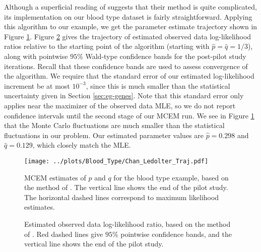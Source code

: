\documentclass[11pt, oneside]{article}   	%
\begin{document}
Although a superficial reading of \citeauthor{Cha95} suggests that their method is quite complicated, its implementation on our blood type dataset is fairly straightforward. Applying this algorithm to our example, we get the parameter estimate trajectory shown in Figure \ref{fig:blood_CL_MCEM_estimates}. Figure \ref{fig:blood_CL_MCEM_likelihoods} gives the trajectory of estimated observed data log-likelihood ratios relative to the starting point of the algorithm (starting with $\hat{p} = \hat{q} = 1/3$), along with pointwise $95\%$ Wald-type confidence bands for the post-pilot study iterations. Recall that these confidence bands are used to assess convergence of the algorithm. We require that the standard error of our estimated log-likelihood increment be at most $10^{-3}$, since this is much smaller than the statistical uncertainty given in Section \ref{sec:eg-genes}. Note that this standard error only applies near the maximizer of the observed data MLE, so we do not report confidence intervals until the second stage of our MCEM run. We see in Figure \ref{fig:blood_CL_MCEM_estimates} that the Monte Carlo fluctuations are much smaller than the statistical fluctuations in our problem. Our estimated parameter values are $\hat{p} = 0.298$ and $\hat{q} = 0.129$, which closely match the MLE.

\begin{figure}
    \centering
    \caption{MCEM estimates of $p$ and $q$ for the blood type example, based on the method of \citet{Cha95}. The vertical line shows the end of the pilot study. The horizontal dashed lines correspond to maximum likelihood estimates.}
    \texttt{[image: ../plots/Blood\_Type/Chan\_Ledolter\_Traj.pdf]} 
    \label{fig:blood_CL_MCEM_estimates}
\end{figure}

\begin{figure}
    \centering
    \caption{Estimated observed data log-likelihood ratio, based on the method of \citet{Cha95}. Red dashed lines give $95\%$ pointwise confidence bands, and the vertical line shows the end of the pilot study.}

    
    \label{fig:blood_CL_MCEM_likelihoods}
\end{figure}
\end{document}
